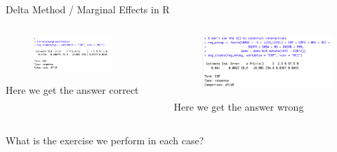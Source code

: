 \begin{frame}{Delta Method / Marginal Effects in R}
\begin{columns}
\begin{column}{0.5\textwidth}
\begin{figure}
\flushleft
	\includegraphics [width=0.8\textwidth]	{marginal_effects}
\end{figure}
Here we get the answer \alert{correct}
\end{column}
\begin{column}{0.5\textwidth}
\begin{figure}
\flushleft
	\includegraphics [width=\textwidth]	{marginal_effects2}
\end{figure}
Here we get the answer \alert{wrong}
\end{column}
\end{columns}
What is the exercise we perform in each case?
\end{frame}

